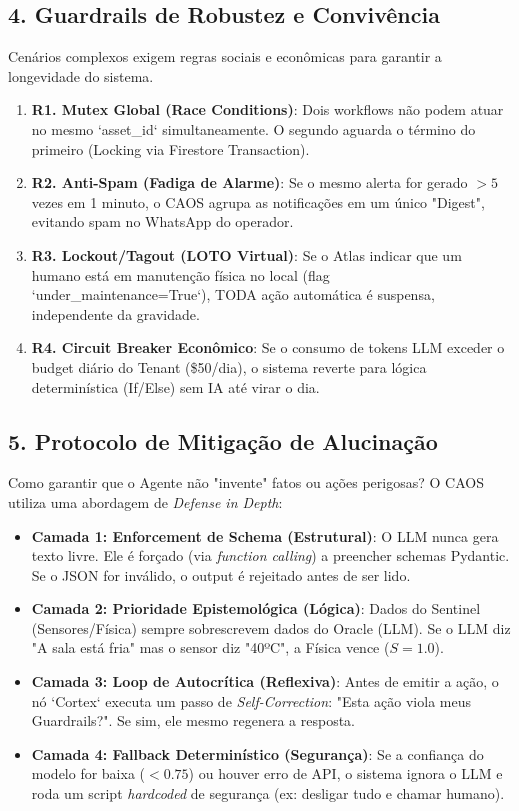 \documentclass[12pt, a4paper]{article}
\begin{document}
\subsection{4. Guardrails de Robustez e Convivência}
Cenários complexos exigem regras sociais e econômicas para garantir a longevidade do sistema.

\begin{enumerate}
    \item \textbf{R1. Mutex Global (Race Conditions)}: Dois workflows não podem atuar no mesmo `asset\_id` simultaneamente. O segundo aguarda o término do primeiro (Locking via Firestore Transaction).
    \item \textbf{R2. Anti-Spam (Fadiga de Alarme)}: Se o mesmo alerta for gerado $>5$ vezes em 1 minuto, o CAOS agrupa as notificações em um único "Digest", evitando spam no WhatsApp do operador.
    \item \textbf{R3. Lockout/Tagout (LOTO Virtual)}: Se o Atlas indicar que um humano está em manutenção física no local (flag `under\_maintenance=True`), TODA ação automática é suspensa, independente da gravidade.
    \item \textbf{R4. Circuit Breaker Econômico}: Se o consumo de tokens LLM exceder o budget diário do Tenant (\$50/dia), o sistema reverte para lógica determinística (If/Else) sem IA até virar o dia.
\end{enumerate}

\subsection{5. Protocolo de Mitigação de Alucinação}
Como garantir que o Agente não "invente" fatos ou ações perigosas? O CAOS utiliza uma abordagem de \textit{Defense in Depth}:

\begin{itemize}
    \item \textbf{Camada 1: Enforcement de Schema (Estrutural)}: O LLM nunca gera texto livre. Ele é forçado (via \textit{function calling}) a preencher schemas Pydantic. Se o JSON for inválido, o output é rejeitado antes de ser lido.
    \item \textbf{Camada 2: Prioridade Epistemológica (Lógica)}: Dados do Sentinel (Sensores/Física) sempre sobrescrevem dados do Oracle (LLM). Se o LLM diz "A sala está fria" mas o sensor diz "40ºC", a Física vence ($S=1.0$).
    \item \textbf{Camada 3: Loop de Autocrítica (Reflexiva)}: Antes de emitir a ação, o nó `Cortex` executa um passo de \textit{Self-Correction}: "Esta ação viola meus Guardrails?". Se sim, ele mesmo regenera a resposta.
    \item \textbf{Camada 4: Fallback Determinístico (Segurança)}: Se a confiança do modelo for baixa ($<0.75$) ou houver erro de API, o sistema ignora o LLM e roda um script \textit{hardcoded} de segurança (ex: desligar tudo e chamar humano).
\end{itemize}
\end{document}
